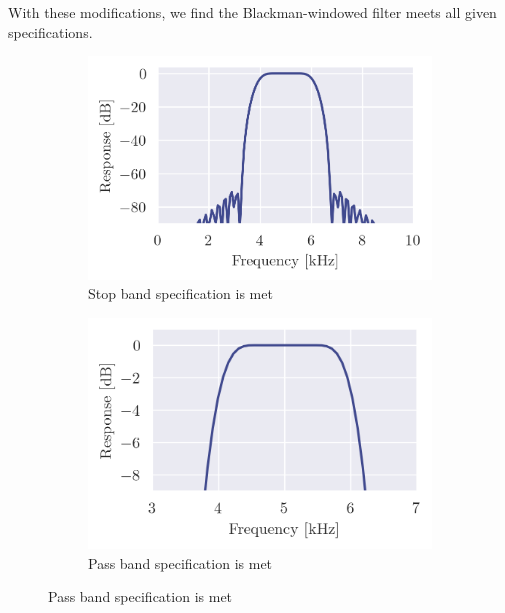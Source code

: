 \newpage

With these modifications, we find the Blackman-windowed filter meets all given specifications.

\begin{figure}[ht]
    \centering
    \begin{subfigure}[b]{0.45\textwidth}
        \centering
        \includegraphics[width=\textwidth]{images/q3_zoom_3.png}
        \caption{Stop band specification is met}
        \label{fig:q3_zoom_3}
    \end{subfigure}
    \hfill
    \begin{subfigure}[b]{0.45\textwidth}
        \centering
        \includegraphics[width=\textwidth]{images/q3_zoom_4.png}
        \caption{Pass band specification is met}
        \label{fig:q3_zoom_4}
    \end{subfigure}
\end{figure}

